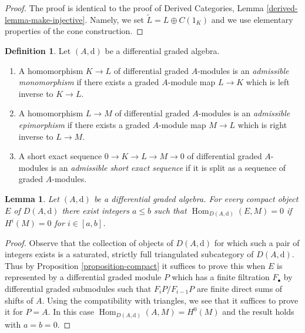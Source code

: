 \documentclass{stacks-project}
\theoremstyle{plain}
\newtheorem{lemma}[subsection]{Lemma}
\theoremstyle{definition}
\newtheorem{definition}[subsection]{Definition}
\theoremstyle{remark}
\numberwithin{equation}{subsection}
\def\Hom{\mathop{\mathrm{Hom}}\nolimits}
\begin{document}
\begin{proof}
The proof is identical to the proof of
Derived Categories, Lemma \ref{derived-lemma-make-injective}.
Namely, we set $\tilde L = L \oplus C(1_K)$ and we use elementary
properties of the cone construction.
\end{proof}

\begin{definition}
\label{definition-admissible-ses}
Let $(A, \text{d})$ be a differential graded algebra.
\begin{enumerate}
\item A homomorphism $K \to L$ of differential graded $A$-modules
is an {\it admissible monomorphism} if there exists a graded $A$-module
map $L \to K$ which is left inverse to $K \to L$.
\item A homomorphism $L \to M$ of differential graded $A$-modules
is an {\it admissible epimorphism} if there exists a graded $A$-module
map $M \to L$ which is right inverse to $L \to M$.
\item A short exact sequence $0 \to K \to L \to M \to 0$ of differential
graded $A$-modules is an {\it admissible short exact sequence}
if it is split as a sequence of graded $A$-modules.
\end{enumerate}
\end{definition}

\begin{lemma}
\label{lemma-compact-implies-bounded}
Let $(A, \text{d})$ be a differential graded algebra.
For every compact object $E$ of $D(A, \text{d})$ there
exist integers $a \leq b$ such that $\Hom_{D(A, \text{d})}(E, M) = 0$
if $H^i(M) = 0$ for $i \in [a, b]$.
\end{lemma}

\begin{proof}
Observe that the collection of objects of $D(A, \text{d})$ for which
such a pair of integers exists is a saturated, strictly full triangulated
subcategory of $D(A, \text{d})$.
Thus by Proposition \ref{proposition-compact} it suffices to prove
this when $E$ is represented by a differential graded module $P$ which
has a finite filtration $F_\bullet$ by differential graded submodules
such that $F_iP/F_{i - 1}P$ are finite direct sums of shifts of $A$.
Using the compatibility with triangles, we see that it suffices
to prove it for $P = A$. In this case $\Hom_{D(A, \text{d})}(A, M) = H^0(M)$
and the result holds with $a = b = 0$.
\end{proof}
\end{document}
